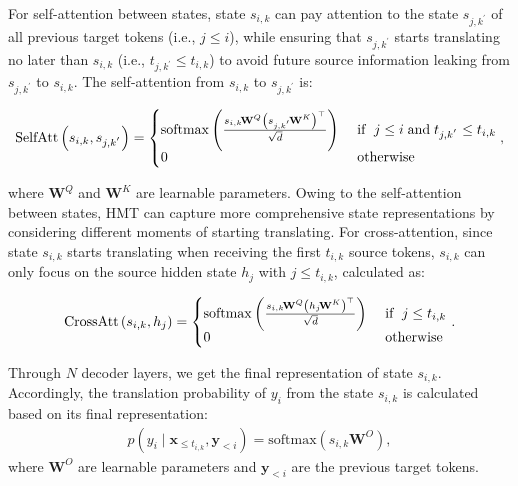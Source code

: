 \documentclass{article} %
\begin{document}
For self-attention between states, state $s_{i,k}$ can pay attention to the state \vspace{-0.1mm}$s_{j,k^{'}}$ of all previous target tokens (i.e., $j\!\leq \!i$), while ensuring that \vspace{-0.1mm}$s_{j,k^{'}}$ starts translating no later than $s_{i,k}$ (i.e., $t_{j,k^{'}}\!\leq \!t_{i,k}$) to avoid future source information leaking from $s_{j,k^{'}}$ to $s_{i,k}$. The self-attention from $s_{i,k}$ to \vspace{-0.1mm}$s_{j,k^{'}}$ is:
\begin{small}\begin{gather}
    \mathrm{SelfAtt}\left ( s_{i,k},s_{j,k^{'}} \right )=\begin{cases}
\vspace{-1mm}\mathrm{softmax}\left ( \frac{s_{i,k}\!\mathbf{W}^{Q}\left (s_{j,k^{'}}\!\mathbf{W}^{K}  \right )^{\top}}{\sqrt{d}} \right ) & \text{ if }\; j\leq i \;\text{and}\; t_{j,k^{'}}\leq t_{i,k} \\
0 & \text{ otherwise } 
\end{cases}, \label{eq:self-attn}
\end{gather}\end{small}where $\mathbf{W}^{Q}$ and $\mathbf{W}^{K}$ are learnable parameters. Owing to the self-attention between states, HMT can capture more comprehensive state \vspace{-0.1mm}representations by considering different moments of starting translating. For cross-attention, since state $s_{i,k}$ starts translating when receiving the first $t_{i,k}$ source tokens, $s_{i,k}$ can only focus on the source hidden state $h_{j}$ with $j\!\leq\! t_{i,k}$, calculated as:
\vspace{-0.15mm}
\begin{small}\begin{gather}
    \mathrm{CrossAtt}\left ( s_{i,k},h_{j} \right )=\begin{cases}
\vspace{-0.9mm}\mathrm{softmax}\left ( \frac{s_{i,k}\!\mathbf{W}^{Q}\left (h_{j}\!\mathbf{W}^{K}  \right )^{\top}}{\sqrt{d}} \right ) & \text{ if }\; j\leq  t_{i,k} \\
0 & \text{ otherwise } 
\end{cases}.
\end{gather}\end{small}\vspace{-0.15mm}Through $N$ decoder layers, we get the final representation of state $s_{i,k}$. Accordingly, the translation probability of $y_{i}$ from the state $s_{i,k}$ is calculated based on its final representation:
\begin{gather}
    p\!\left (y_{i}\mid \mathbf{x}_{\leq t_{i,k}},\mathbf{y}_{<i}  \right )=\mathrm{softmax}\left ( s_{i,k}\!\mathbf{W}^{O} \right ), \label{eq:translation}
\end{gather}
where $\mathbf{W}^{O}$ are learnable parameters and $\mathbf{y}_{<i}$ are the previous target tokens.
\end{document}

